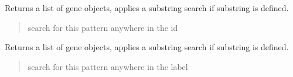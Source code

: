 \documentclass[letterpaper,12pt,english]{sphinxmanual}
\begin{document}
\begin{fulllineitems}
\begin{fulllineitems}
\begin{quote}
\begin{description}
\end{description}\end{quote}

\end{fulllineitems}


\begin{fulllineitems}
\label{\detokenize{api/core:cbmpy.CBModel.Model.getGeneObjects}}
\pysigstartsignatures
\pysiglinewithargsret
{}
{}
{}
\pysigstopsignatures
\sphinxAtStartPar
Returns a list of gene objects, applies a substring search if substring is defined.
\begin{quote}\begin{description}
\sphinxAtStartPar
{} \textendash{} search for this pattern anywhere in the id

\end{description}\end{quote}

\end{fulllineitems}


\begin{fulllineitems}
\label{\detokenize{api/core:cbmpy.CBModel.Model.getGeneObjectsByLabel}}
\pysigstartsignatures
\pysiglinewithargsret
{}
{}
{}
\pysigstopsignatures
\sphinxAtStartPar
Returns a list of gene objects, applies a substring search if substring is defined.
\begin{quote}\begin{description}
\sphinxAtStartPar
{} \textendash{} search for this pattern anywhere in the label

\end{description}\end{quote}

\end{fulllineitems}


\end{fulllineitems}
\end{document}
